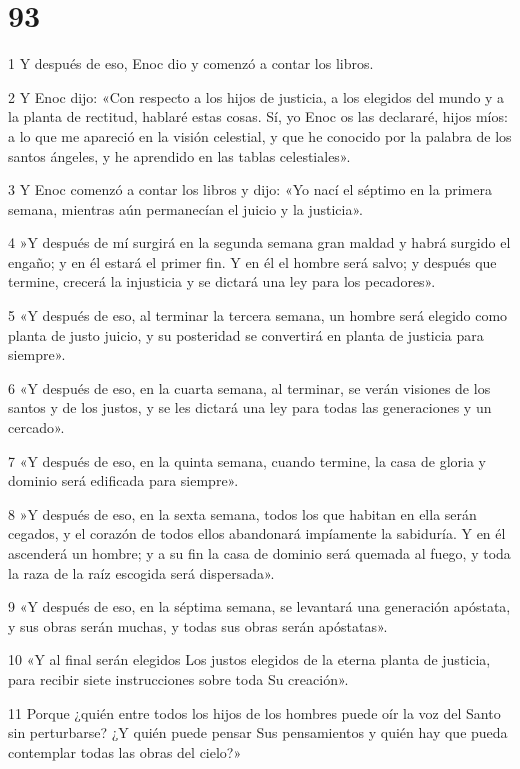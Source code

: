 \chapter{93}

\par 1 Y después de eso, Enoc dio y comenzó a contar los libros.
\par 2 Y Enoc dijo: «Con respecto a los hijos de justicia, a los elegidos del mundo y a la planta de rectitud, hablaré estas cosas. Sí, yo Enoc os las declararé, hijos míos: a lo que me apareció en la visión celestial, y que he conocido por la palabra de los santos ángeles, y he aprendido en las tablas celestiales».
\par 3 Y Enoc comenzó a contar los libros y dijo: «Yo nací el séptimo en la primera semana, mientras aún permanecían el juicio y la justicia».
\par 4 »Y después de mí surgirá en la segunda semana gran maldad y habrá surgido el engaño; y en él estará el primer fin. Y en él el hombre será salvo; y después que termine, crecerá la injusticia y se dictará una ley para los pecadores».
\par 5 «Y después de eso, al terminar la tercera semana, un hombre será elegido como planta de justo juicio, y su posteridad se convertirá en planta de justicia para siempre».
\par 6 «Y después de eso, en la cuarta semana, al terminar, se verán visiones de los santos y de los justos, y se les dictará una ley para todas las generaciones y un cercado».
\par 7 «Y después de eso, en la quinta semana, cuando termine, la casa de gloria y dominio será edificada para siempre».
\par 8 »Y después de eso, en la sexta semana, todos los que habitan en ella serán cegados, y el corazón de todos ellos abandonará impíamente la sabiduría. Y en él ascenderá un hombre; y a su fin la casa de dominio será quemada al fuego, y toda la raza de la raíz escogida será dispersada».
\par 9 «Y después de eso, en la séptima semana, se levantará una generación apóstata, y sus obras serán muchas, y todas sus obras serán apóstatas».
\par 10 «Y al final serán elegidos Los justos elegidos de la eterna planta de justicia, para recibir siete instrucciones sobre toda Su creación».
\par 11 Porque ¿quién entre todos los hijos de los hombres puede oír la voz del Santo sin perturbarse? ¿Y quién puede pensar Sus pensamientos y quién hay que pueda contemplar todas las obras del cielo?»
